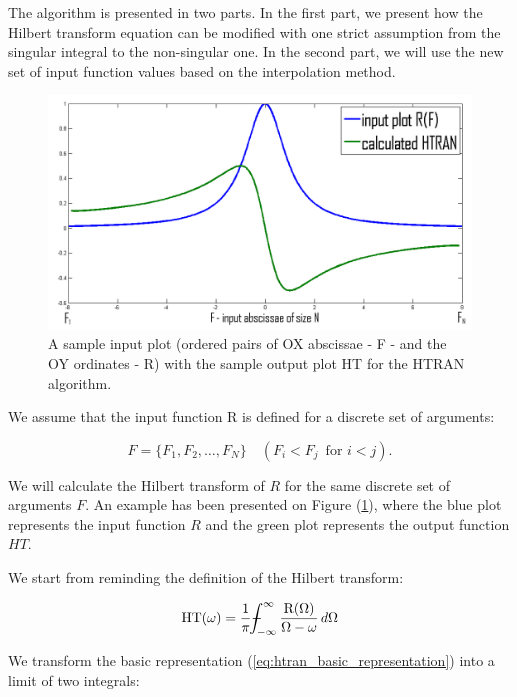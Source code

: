 \documentclass[12pt,twoside,a4paper]{article}
\numberwithin{equation}{subsection}
\numberwithin{figure}{subsection}
\def\Xint#1{\mathchoice
{\XXint\displaystyle\textstyle{#1}}%
{\XXint\textstyle\scriptstyle{#1}}%
{\XXint\scriptstyle\scriptscriptstyle{#1}}%
{\XXint\scriptscriptstyle\scriptscriptstyle{#1}}%
\!\int}
\def\XXint#1#2#3{{\setbox0=\hbox{$#1{#2#3}{\int}$ }\vcenter{\hbox{$#2#3$ }}\kern-.6\wd0}}
\def\dashint{\Xint-}
\begin{document}
The algorithm is presented in two parts. In the first part, we present how the Hilbert transform equation can be modified with one strict assumption from the singular integral to the non-singular one. In the second part, we will use the new set of input function values based on the interpolation method.

\begin{figure}
	\includegraphics[width=150mm]{img/htran_illustration.png}
	\caption{A sample input plot (ordered pairs of OX abscissae - F - and the OY ordinates - R) with the sample output plot HT for the HTRAN algorithm. \label{fig:htran_illustration}} 
\end{figure}

We assume that the input function R is defined for a discrete set of arguments:
 
\begin{equation} \label{eq:htran_arguments}
	F = \{ F_1, F_2, \ldots, F_N \} \quad (F_i < F_j \, \text{ for } i < j) . 
\end{equation}

We will calculate the Hilbert transform of $R$ for the same discrete set of arguments $F$. An example has been presented on Figure (\ref{fig:htran_illustration}), where the blue plot represents the input function $R$ and the green plot represents the output function $HT$.


We start from reminding the definition of the Hilbert transform:

\begin{equation} \label{eq:htran_basic_representation}
 \mathrm{HT}(\omega )
  = \frac{1}{\pi } {\dashint_{ - \infty }^{\infty }  \frac {\mathrm{R}(\Omega )}{\Omega - \omega }\,d\Omega }
\end{equation}

We transform the basic representation (\ref{eq:htran_basic_representation}) into a limit of two integrals:
\end{document}
